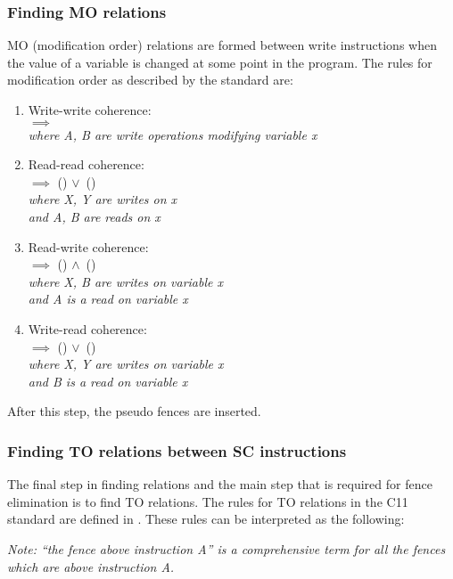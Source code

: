 \subsubsection{Finding MO relations}
MO (modification order) relations are formed between write instructions when the value of a variable is changed at some point in the program. The rules for modification order as described by the standard are:
\begin{enumerate}
    \item Write-write coherence: \\
     $\implies$ \\
    \textit{where A, B are write operations modifying variable x}
    
    \item Read-read coherence:\\
     $\implies$ () $\lor$\ ()\\
    \textit{where X, Y are writes on x\\ and A, B are reads on x}
    
    \item Read-write coherence:\\
     $\implies$ () $\land$\ ()\\
    \textit{where X, B are writes on variable x\\and A is a read on variable x}
    
    \item Write-read coherence:\\
     $\implies$ () $\lor$\ ()\\
    \textit{where X, Y are writes on variable x\\and B is a read on variable x}
\end{enumerate}

\par
After this step, the pseudo fences are inserted.

\subsubsection{Finding TO relations between SC instructions}\label{to_rel}
The final step in finding relations and the main step that is required for fence elimination is to find TO relations. The rules for TO relations in the C11 standard are defined in . These rules can be interpreted as the following:

\textit{Note: ``the fence above instruction A'' is a comprehensive term for all the fences which are above instruction A.}

